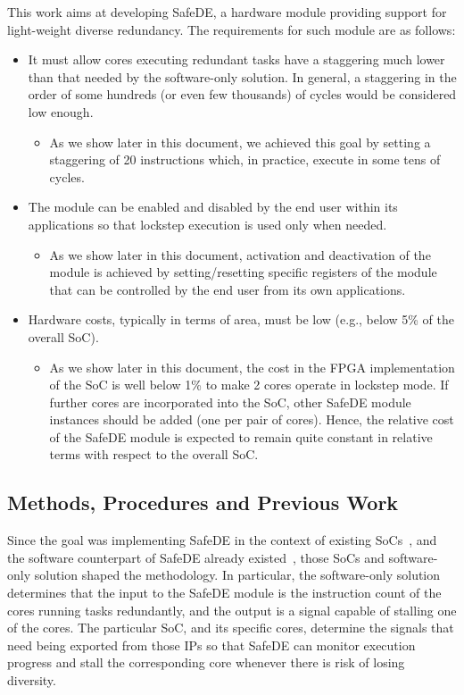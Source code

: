 This work aims at developing SafeDE, a hardware module providing support for light-weight diverse redundancy. The requirements for such module are as follows:
\begin{itemize}
\item It must allow cores executing redundant tasks have a staggering much lower than that needed by the software-only solution. In general, a staggering in the order of some hundreds (or even few thousands) of cycles would be considered low enough. 
\begin{itemize}
\item As we show later in this document, we achieved this goal by setting a staggering of 20 instructions which, in practice, execute in some tens of cycles.
\end{itemize}
\item The module can be enabled and disabled by the end user within its applications so that lockstep execution is used only when needed. 
\begin{itemize}
\item As we show later in this document, activation and deactivation of the module is achieved by setting/resetting specific registers of the module that can be controlled by the end user from its own applications.
\end{itemize}
\item Hardware costs, typically in terms of area, must be low (e.g., below 5\% of the overall SoC).
\begin{itemize}
\item As we show later in this document, the cost in the FPGA implementation of the SoC is well below 1\% to make 2 cores operate in lockstep mode. If further cores are incorporated into the SoC, other SafeDE module instances should be added (one per pair of cores). Hence, the relative cost of the SafeDE module is expected to remain quite constant in relative terms with respect to the overall SoC.
\end{itemize}
\end{itemize}


\subsection{Methods, Procedures and Previous Work}
Since the goal was implementing SafeDE in the context of existing SoCs~\cite{gomez2020risc,SELENEgit}, and the software counterpart of SafeDE already existed~\cite{alcaide2020software}, those SoCs and software-only solution shaped the methodology. In particular, the software-only solution determines that the input to the SafeDE module is the instruction count of the cores running tasks redundantly, and the output is a signal capable of stalling one of the cores. The particular SoC, and its specific cores, determine the signals that need being exported from those IPs so that SafeDE can monitor execution progress and stall the corresponding core whenever there is risk of losing diversity.

